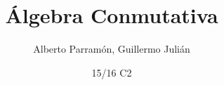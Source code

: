 \documentclass[palatino]{apuntes}
\title{Álgebra Conmutativa}
\author{Alberto Parramón, Guillermo Julián}
\date{15/16 C2}
\begin{document}
\pagestyle{plain}
\maketitle

\renewcommand{\chaptername}{Tema}

\renewcommand\thechapter{\arabic{chapter}}

\newcommand{\field}{\ensuremath{\mathbb{F}}\xspace}
\newcommand{\K}{\ensuremath{\mathbb{K}}\xspace}
\renewcommand\tq{:}
\renewcommand{\U}{\ensuremath{\mathcal{U}}\xspace}
\newcommand{\zero}{\ensuremath{\mathbbold{0}}\xspace}
\newcommand{\one}{\ensuremath{\mathbbm{1}}\xspace}
\newcommand{\cls}{\gor} %
\newcommand{\nil}{\mop{Nil}}

\newcommand{\zerogen}{\ensuremath{\mathopen{\langle} \zero \mathclose{\rangle}}\xspace} %

\newcommand{\st}{\text{ tal que }}
\newcommand{\wrt}{\text{ con respecto de }}
\newcommand{\ie}{\text{, es decir, }}

\tableofcontents
\newpage




\appendix




\nocite{reidAG,reidCA}
{}

\printindex
\end{document}
